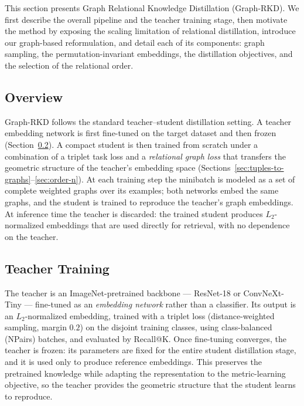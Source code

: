 \documentclass[11pt,letterpaper]{article}
\begin{document}
This section presents Graph Relational Knowledge Distillation (Graph-RKD). We first
describe the overall pipeline and the teacher training stage, then motivate the
method by exposing the scaling limitation of relational distillation, introduce our
graph-based reformulation, and detail each of its components: graph sampling, the
permutation-invariant embeddings, the distillation objectives, and the selection of
the relational order.

\subsection{Overview}
\label{sec:method-overview}

Graph-RKD follows the standard teacher--student distillation setting. A teacher
embedding network is first fine-tuned on the target dataset and then frozen
(Section~\ref{sec:phase-teacher}). A compact student is then trained from scratch
under a combination of a triplet task loss and a \emph{relational graph loss} that
transfers the geometric structure of the teacher's embedding space
(Sections~\ref{sec:tuples-to-graphs}--\ref{sec:order-n}). At each training step the
minibatch is modeled as a set of complete weighted graphs over its examples; both
networks embed the same graphs, and the student is trained to reproduce the
teacher's graph embeddings. At inference time the teacher is discarded: the trained
student produces $L_2$-normalized embeddings that are used directly for retrieval,
with no dependence on the teacher.

\subsection{Teacher Training}
\label{sec:phase-teacher}

The teacher is an ImageNet-pretrained backbone --- ResNet-18 or ConvNeXt-Tiny ---
fine-tuned as an \emph{embedding network} rather than a classifier. Its output is an
$L_2$-normalized embedding, trained with a triplet loss (distance-weighted sampling,
margin $0.2$) on the disjoint training classes, using class-balanced (NPairs)
batches, and evaluated by Recall@K. Once fine-tuning converges, the teacher is
frozen: its parameters are fixed for the entire student distillation stage, and it
is used only to produce reference embeddings. This preserves the pretrained
knowledge while adapting the representation to the metric-learning objective, so the
teacher provides the geometric structure that the student learns to reproduce.
\end{document}

